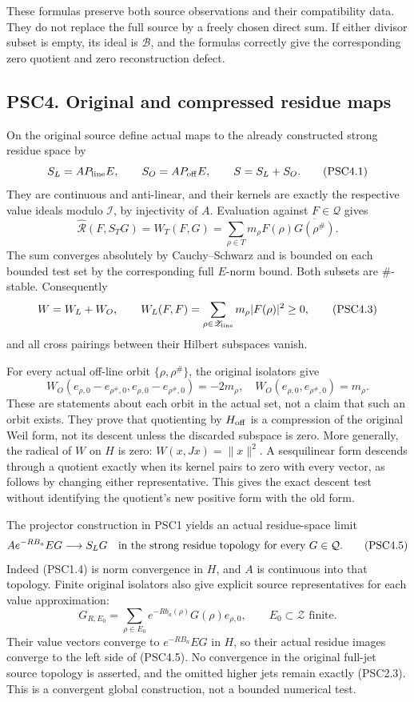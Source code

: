 These formulas preserve both source observations and their compatibility
data. They do not replace the full source by a freely chosen direct sum.
If either divisor subset is empty, its ideal is \(\mathcal B\), and the
formulas correctly give the corresponding zero quotient and zero
reconstruction defect.

\subsection{PSC4. Original and compressed residue
maps}\label{psc4.-original-and-compressed-residue-maps}

On the original source define actual maps to the already constructed
strong residue space by \[
S_L=AP_{\rm line}E,\qquad S_O=AP_{\rm off}E,\qquad S=S_L+S_O.
\tag{PSC4.1}
\] They are continuous and anti-linear, and their kernels are exactly
the respective value ideals modulo \(\mathcal I\), by injectivity of
\(A\). Evaluation against \(F\in\mathcal Q\) gives \[
\widehat{\mathcal R}(F,S_TG)=W_T(F,G)
=\sum_{\rho\in T}m_\rho F(\rho)\overline{G(\rho^\#)}.
\tag{PSC4.2}
\] The sum converges absolutely by Cauchy--Schwarz and is bounded on
each bounded test set by the corresponding full \(E\)-norm bound. Both
subsets are \(\#\)-stable. Consequently \[
W=W_L+W_O,\qquad W_L(F,F)=\sum_{\rho\in\mathscr Z_{\rm line}}m_\rho|F(\rho)|^2\ge0,
\tag{PSC4.3}
\] and all cross pairings between their Hilbert subspaces vanish.

For every actual off-line orbit \(\{\rho,\rho^\#\}\), the original
isolators give \[
W_O(e_{\rho,0}-e_{\rho^\#,0},e_{\rho,0}-e_{\rho^\#,0})=-2m_\rho,
\quad
W_O(e_{\rho,0},e_{\rho^\#,0})=m_\rho.
\tag{PSC4.4}
\] These are statements about each orbit in the actual set, not a claim
that such an orbit exists. They prove that quotienting by
\(H_{\rm off}\) is a compression of the original Weil form, not its
descent unless the discarded subspace is zero. More generally, the
radical of \(W\) on \(H\) is zero: \(W(x,Jx)=\|x\|^2\). A sesquilinear
form descends through a quotient exactly when its kernel pairs to zero
with every vector, as follows by changing either representative. This
gives the exact descent test without identifying the quotient's new
positive form with the old form.

The projector construction in PSC1 yields an actual residue-space limit
\[
A e^{-RB_a}EG\longrightarrow S_LG
\quad\hbox{in the strong residue topology for every }G\in\mathcal Q.
\tag{PSC4.5}
\] Indeed (PSC1.4) is norm convergence in \(H\), and \(A\) is continuous
into that topology. Finite original isolators also give explicit source
representatives for each value approximation: \[
G_{R,E_0}=\sum_{\rho\in E_0}e^{-Rb_a(\rho)}G(\rho)e_{\rho,0},
\qquad E_0\subset\mathscr Z\text{ finite}.
\tag{PSC4.6}
\] Their value vectors converge to \(e^{-RB_a}EG\) in \(H\), so their
actual residue images converge to the left side of (PSC4.5). No
convergence in the original full-jet source topology is asserted, and
the omitted higher jets remain exactly (PSC2.3). This is a convergent
global construction, not a bounded numerical test.

